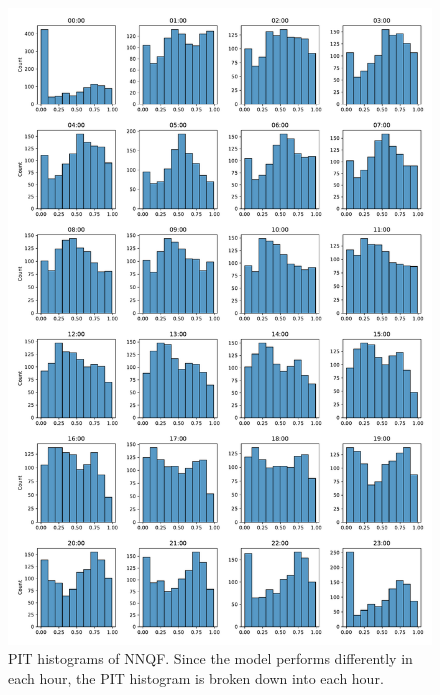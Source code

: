 \begin{figure}[h]%
    \centering
    \includegraphics[width=\textwidth]{plots/pit/pit_by_hour_nnqf.pdf}
    \caption[PIT histograms NNQF]{PIT histograms of NNQF. Since the model performs differently 
    in each hour, the PIT histogram is broken down into each hour.}%
    \label{fig:pit-nnqf-by-hour}%
\end{figure}

